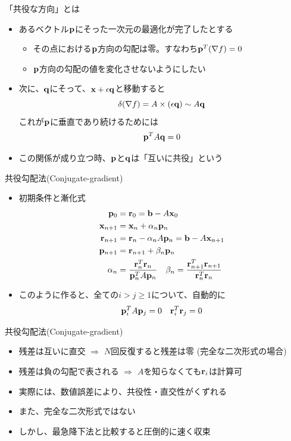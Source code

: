 \documentclass[dvipdfmx]{beamer}
\begin{document}
\begin{frame}[t,fragile]{「共役な方向」とは}
  \begin{itemize}
    \setlength{\itemsep}{1em}
  \item あるベクトル${\bf p}$にそった一次元の最適化が完了したとする
    \begin{itemize}
    \item その点における${\bf p}$方向の勾配は零。すなわち${\bf p}^T (\nabla f)=0$
    \item ${\bf p}$方向の勾配の値を変化させないようにしたい
  \end{itemize}
  \item 次に、${\bf q}$にそって、${\bf x}+\epsilon {\bf q}$と移動すると
    \[
      \delta(\nabla f) = A \times (\epsilon {\bf q}) \sim A {\bf q}
      \]
      これが${\bf p}$に垂直であり続けるためには
    \[
      {\bf p}^T A {\bf q} = 0
      \]
    \item この関係が成り立つ時、${\bf p}$と${\bf q}$は「互いに共役」という
  \end{itemize}
\end{frame}

\begin{frame}[t,fragile]{共役勾配法(Conjugate-gradient)}
  \begin{itemize}
    \setlength{\itemsep}{1em}
  \item 初期条件と漸化式
    \begin{align*}
      {\bf p}_0 &= {\bf r}_0 = {\bf b} - A {\bf x}_0 \\
      {\bf x}_{n+1} &= {\bf x}_n + \alpha_n {\bf p}_n \\
      {\bf r}_{n+1} &= {\bf r}_n - \alpha_n A {\bf p}_n = {\bf b} - A {\bf x}_{n+1} \\
      {\bf p}_{n+1} &= {\bf r}_{n+1} + \beta_n {\bf p}_n \\
      \alpha_n &= \frac{{\bf r}_n^T {\bf r}_n}{{\bf p}_n^T A {\bf p}_n} \ \ \
      \beta_n = \frac{{\bf r}_{n+1}^T {\bf r}_{n+1}}{{\bf r}_n^T {\bf r}_n}
    \end{align*}
  \item このように作ると、全ての$i>j \ge 1$について、自動的に
    \[
      {\bf p}_i^T A {\bf p}_j = 0 \ \ \ {\bf r}_i^T {\bf r}_j = 0
      \]
  \end{itemize}
\end{frame}

\begin{frame}[t,fragile]{共役勾配法(Conjugate-gradient)}
  \begin{itemize}
    \setlength{\itemsep}{1em}
  \item 残差は互いに直交 $\Rightarrow$ $N$回反復すると残差は零 (完全な二次形式の場合)
  \item 残差は負の勾配で表される $\Rightarrow$ $A$を知らなくても${\bf r}_i$は計算可
  \item 実際には、数値誤差により、共役性・直交性がくずれる
  \item また、完全な二次形式ではない
  \item しかし、最急降下法と比較すると圧倒的に速く収束
  \end{itemize}
\end{frame}
\end{document}
